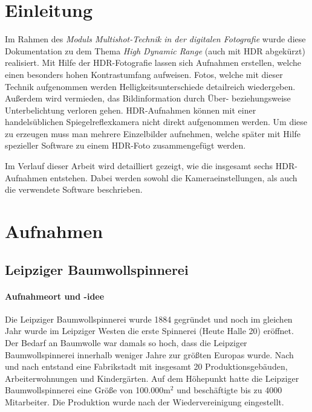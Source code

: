 \documentclass[liststotoc,bibtotoc,fontsize=14pt,]{scrreprt}
\begin{document}
	\chapter{Einleitung}
	\label{ch:einleitung}
	Im Rahmen des \textit{Moduls Multishot-Technik in der digitalen Fotografie} wurde diese Dokumentation zu dem Thema \textit{High Dynamic Range} (auch mit HDR abgekürzt) realisiert. Mit Hilfe der HDR-Fotografie lassen sich Aufnahmen erstellen, welche einen besonders hohen Kontrastumfang aufweisen. Fotos, welche mit dieser Technik aufgenommen werden Helligkeitsunterschiede detailreich wiedergeben. Außerdem wird vermieden, das Bildinformation durch Über- beziehungsweise Unterbelichtung verloren gehen. HDR-Aufnahmen können mit  einer handelsüblichen Spiegelreflexkamera nicht direkt aufgenommen werden. Um diese zu erzeugen muss man mehrere Einzelbilder aufnehmen, welche später mit Hilfe spezieller Software zu einem HDR-Foto zusammengefügt werden.
	
	\bigskip
	Im Verlauf dieser Arbeit wird detailliert gezeigt, wie die insgesamt sechs HDR-Aufnahmen entstehen. Dabei werden sowohl die  Kameraeinstellungen, als auch die verwendete Software beschrieben. 
		
	\chapter{Aufnahmen}
	\label{ch:aufnahmen}
	
	\section{Leipziger Baumwollspinnerei}
	\label{sec:spinnerei}

	\subsubsection{Aufnahmeort und -idee}
	Die Leipziger Baumwollspinnerei wurde 1884 gegründet und noch im gleichen Jahr wurde im Leipziger Westen die erste Spinnerei (Heute Halle 20) eröffnet. Der Bedarf an Baumwolle war damals so hoch, dass die Leipziger Baumwollspinnerei innerhalb weniger Jahre zur größten Europas wurde. Nach und nach entstand eine Fabrikstadt mit insgesamt 20 Produktionsgebäuden, Arbeiterwohnungen und Kindergärten. Auf dem Höhepunkt hatte die Leipziger Baumwollspinnerei eine Größe von 100.000m$^2$ und beschäftigte bis zu 4000 Mitarbeiter. Die Produktion wurde nach der Wiedervereinigung eingestellt.
	
\end{document}
